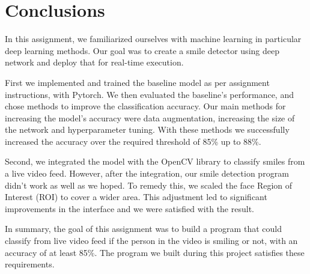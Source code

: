 \documentclass[12pt,a4paper,english
]{tunithesis}
\begin{document}
\chapter{Conclusions}
\label{ch:conclusions}

In this assignment, we familiarized ourselves with machine learning in particular deep learning methods. Our goal was to create a smile detector using deep network and deploy that for real-time execution. 

First we implemented and trained the baseline model as per assignment instructions, with Pytorch. We then evaluated the baseline's performance, and chose methods to improve the classification accuracy. Our main methods for increasing the model's accuracy were data augmentation, increasing the size of the network and hyperparameter tuning. With these methods we successfully increased the accuracy over the required threshold of 85\% up to 88\%.

Second, we integrated the model with the OpenCV library to classify smiles from a live video feed. However, after the integration, our smile detection program didn't work as well as we hoped. To remedy this, we scaled the face Region of Interest (ROI) to cover a wider area. This adjustment led to significant improvements in the interface and we were satisfied with the result.

In summary, the goal of this assignment was to build a program that could classify from live video feed if the person in the video is smiling or not, with an accuracy of at least 85\%. The program we built during this project satisfies these requirements.
%
%
\newpage

\printbibliography[title=References]
\end{document}
